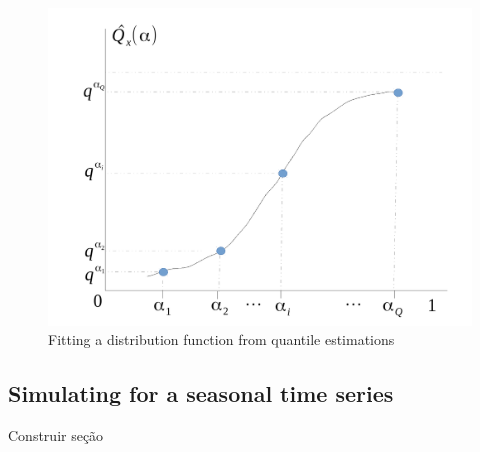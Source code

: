 \begin{figure}[h]
\centering
\includegraphics[width=0.7\linewidth]{Figuras/grafico-quantis-fx}
\caption{Fitting a distribution function from quantile estimations}
\label{fig:grafico-quantis-fx}
\end{figure}


\subsection{Simulating for a seasonal time series}

Construir seção